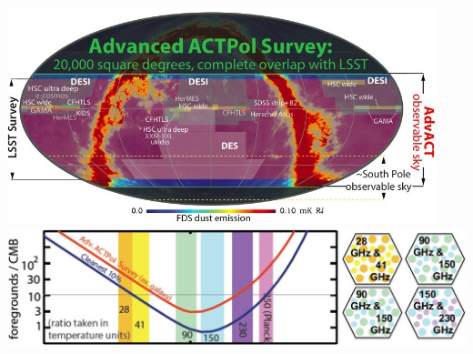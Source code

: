 \documentclass[table]{beamer}
\begin{document}
\begin{frame}
	\centering
	\hspace*{-0.8cm}\includegraphics[width=12.5cm]{advact_sky_coverage.png} \\
	\includegraphics[width=\textwidth]{advact_multichroic.png}
\end{frame}
\end{document}
